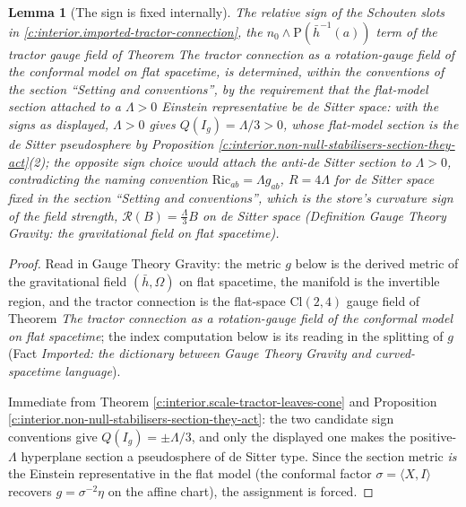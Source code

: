 \documentclass[11pt]{article}
\newtheorem{lemma}[theorem]{Lemma}
\theoremstyle{definition}
\theoremstyle{plain}
\newcommand{\changedmark}[2]{\marginpar{\raggedright\scriptsize\color{#1}#2}}
\providecommand{\Cl}{}\renewcommand{\Cl}{\mathrm{Cl}}
\providecommand{\Ric}{}\renewcommand{\Ric}{\mathrm{Ric}}
\providecommand{\Sch}{}\renewcommand{\Sch}{\mathrm{P}}
\providecommand{\hb}{}\renewcommand{\hb}{\bar{h}}
\providecommand{\nO}{}\renewcommand{\nO}{n_0}
\providecommand{\ip}{}\renewcommand{\ip}[2]{\langle #1, #2\rangle}
\begin{document}
\begin{lemma}[The sign is fixed internally]\label{c:interior.sign-fixed-internally}
\changedmark{gray}{reworded}
The relative sign of the Schouten slots in \ref{c:interior.imported-tractor-connection}, the $\nO \wedge \Sch(\hb^{-1}(a))$ term of the tractor gauge field of Theorem \emph{The tractor connection as a rotation-gauge field of the conformal model on flat spacetime}, is determined, within the conventions of the section ``Setting and conventions'', by the requirement that the flat-model section attached to a $\Lambda > 0$ Einstein representative be de Sitter space: with the signs as displayed, $\Lambda > 0$ gives $Q(I_g) = \Lambda/3 > 0$, whose flat-model section is the de Sitter pseudosphere by Proposition \ref{c:interior.non-null-stabilisers-section-they-act}(2); the opposite sign choice would attach the anti-de Sitter section to $\Lambda > 0$, contradicting the naming convention $\Ric_{ab} = \Lambda g_{ab}$, $R = 4\Lambda$ for de Sitter space fixed in the section ``Setting and conventions'', which is the store's curvature sign of the field strength, $\mathcal{R}(B) = \tfrac{\Lambda}{3}B$ on de Sitter space (Definition \emph{Gauge Theory Gravity: the gravitational field on flat spacetime}).
\end{lemma}
\begin{proof}
Read in Gauge Theory Gravity: the metric $g$ below is the derived metric of the gravitational field $(\hb, \Omega)$ on flat spacetime, the manifold is the invertible region, and the tractor connection is the flat-space $\Cl(2,4)$ gauge field of Theorem \emph{The tractor connection as a rotation-gauge field of the conformal model on flat spacetime}; the index computation below is its reading in the splitting of $g$ (Fact \emph{Imported: the dictionary between Gauge Theory Gravity and curved-spacetime language}).

Immediate from Theorem \ref{c:interior.scale-tractor-leaves-cone} and Proposition \ref{c:interior.non-null-stabilisers-section-they-act}: the two candidate sign conventions give $Q(I_g) = \pm\Lambda/3$, and only the displayed one makes the positive-$\Lambda$ hyperplane section a pseudosphere of de Sitter type. Since the section metric \emph{is} the Einstein representative in the flat model (the conformal factor $\sigma = \ip{X}{I}$ recovers $g = \sigma^{-2}\eta$ on the affine chart), the assignment is forced.

\end{proof}
\end{document}

